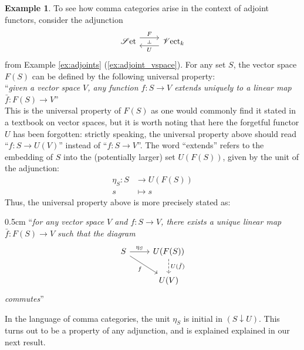 \documentclass[10pt,oneside]{book}
\def\~#1{\mathscr{#1}}
\newcommand{\Set}{\~S\mathrm{et}}
\newcommand{\Vect}{\~V\mathrm{ect}}
\theoremstyle{plain}
\theoremstyle{definition}
\newtheorem{ex}[thm]{Example}
\theoremstyle{remark}
\numberwithin{equation}{section}
\numberwithin{figure}{section}
\begin{document}
\begin{ex}
To see how comma categories arise in the context of adjoint functors, consider the adjunction
\[\begin{tikzcd}
            {\Set} & {\Vect_k}
            \arrow[""{name=0, anchor=center, inner sep=0}, "F", shift left=2, from=1-1, to=1-2]
            \arrow[""{name=1, anchor=center, inner sep=0}, "U", shift left=2, from=1-2, to=1-1]
            \arrow["\dashv"{anchor=center, rotate=-90}, draw=none, from=0, to=1]
        \end{tikzcd}\]
from Example \ref{ex:adjoints} (\ref{ex:adjoint_vspace}). For any set $S$, the vector space $F(S)$ can be defined by the following universal property:\\

``\emph{given a vector space $V$, any function $f: S \to V$ extends uniquely to a linear map $\bar{f}: F(S) \to V$}''\\

This is the universal property of $F(S)$ as one would commonly find it stated in a textbook on vector spaces, but it is worth noting that here the forgetful functor $U$ has been forgotten: strictly speaking, the universal property above should read ``$f: S \to U(V)$'' instead of ``$f: S \to V$''. The word ``extends'' refers to the embedding of $S$ into the (potentially larger) set $U(F(S))$, given by the unit of the adjunction:
\begin{align*}
    \eta_S: S &\to U(F(S)) \\
    s &\mapsto s
\end{align*}
Thus, the universal property above is more precisely stated as:\\
\begin{adjustwidth}{0.5cm}{}
``\emph{for any vector space $V$ and $f: S \to V$, there exists a unique linear map $\bar{f}: F(S) \to V$ such that the diagram}
\[\begin{tikzcd}
    S & {U(F(S))} \\
    & {U(V)}
    \arrow["{\eta_S}", from=1-1, to=1-2]
    \arrow["f"', from=1-1, to=2-2]
    \arrow["{U(\bar{f})}", dashed, from=1-2, to=2-2]
\end{tikzcd}\] 
\emph{commutes}''
\end{adjustwidth}
In the language of comma categories, the unit $\eta_S$ is initial in $(S \downarrow U)$. This turns out to be a property of any adjunction, and is explained explained in our next result.
\end{ex}
\end{document}
